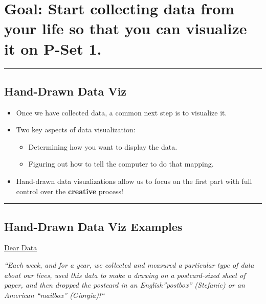 \documentclass[
  letterpaper,
  DIV=11,
  numbers=noendperiod]{scrartcl}
\begin{document}
\hypertarget{goal-start-collecting-data-from-your-life-so-that-you-can-visualize-it-on-p-set-1.}{%
\section{Goal: Start collecting data from your life so that you can
visualize it on P-Set
1.}\label{goal-start-collecting-data-from-your-life-so-that-you-can-visualize-it-on-p-set-1.}}

\begin{center}\rule{0.5\linewidth}{0.5pt}\end{center}

\hypertarget{hand-drawn-data-viz}{%
\subsection{Hand-Drawn Data Viz}\label{hand-drawn-data-viz}}

\begin{itemize}
\item
  Once we have collected data, a common next step is to visualize it.
\item
  Two key aspects of data visualization:

  \begin{itemize}
  \item
    Determining how you want to display the data.
  \item
    Figuring out how to tell the computer to do that mapping.
  \end{itemize}
\item
  Hand-drawn data visualizations allow us to focus on the first part
  with full control over the \textbf{creative} process!
\end{itemize}

\begin{center}\rule{0.5\linewidth}{0.5pt}\end{center}

\hypertarget{hand-drawn-data-viz-examples}{%
\subsection{Hand-Drawn Data Viz
Examples}\label{hand-drawn-data-viz-examples}}

\href{http://www.dear-data.com/theproject}{Dear Data}

\emph{``Each week, and for a year, we collected and measured a
particular type of data about our lives, used this data to make a
drawing on a postcard-sized sheet of paper, and then dropped the
postcard in an English''postbox'' (Stefanie) or an American ``mailbox''
(Giorgia)!{}``}
\end{document}
